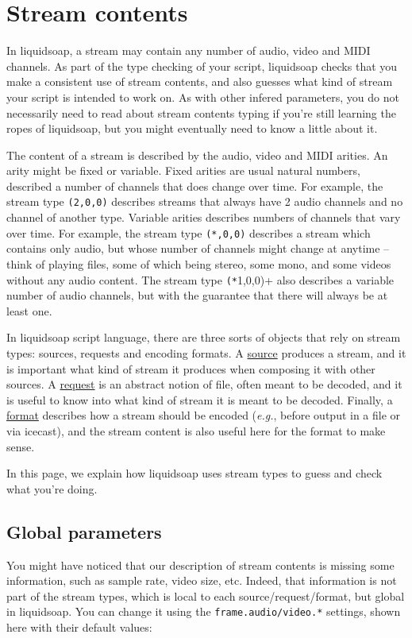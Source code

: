 \section{Stream contents}
In liquidsoap, a stream may contain any number of audio, video and
MIDI channels. As part of the type checking of your script,
liquidsoap checks that you make a consistent use of stream contents,
and also guesses what kind of stream your script is intended to
work on. As with other infered parameters, you do not necessarily
need to read about stream contents typing if you're still learning
the ropes of liquidsoap, but you might eventually need to know a
little about it.

The content of a stream is described by the audio, video and MIDI
arities. An arity might be fixed or variable. Fixed arities are usual
natural numbers, described a number of channels that does change over
time. For example, the stream type \verb+(2,0,0)+ describes
streams that always have 2 audio channels and no channel of another
type. Variable arities describes numbers of channels that vary over
time. For example, the stream type \verb+(*,0,0)+ describes
a stream which contains only audio, but whose number of channels
might change at anytime -- think of playing files, some of which
being stereo, some mono, and some videos without any audio content.
The stream type \verb+(*+1,0,0)+ also describes a variable
number of audio channels, but with the guarantee that there will
always be at least one.

In liquidsoap script language, there are three sorts of objects
that rely on stream types: sources, requests and encoding formats.
A \href{sources.html}{source} produces a stream,
and it is important what kind of stream
it produces when composing it with other sources.
A \href{requests.html}{request} is an abstract notion of file,
often meant to be decoded, and it is useful to know into what
kind of stream it is meant to be decoded.
Finally, a \href{encoding_formats.html}{format} describes how a stream
should be encoded (\emph{e.g.}, before output in a file or via icecast),
and the stream content is also useful here for the format
to make sense.

In this page, we explain how liquidsoap uses stream types
to guess and check what you're doing.

\subsection{Global parameters}
You might have noticed that our description of stream contents is
missing some information, such as sample rate, video size, etc.
Indeed, that information is not part of the stream types, which is
local to each source/request/format, but global in liquidsoap.
You can change it using the \verb+frame.audio/video.*+
settings, shown here with their default values:


